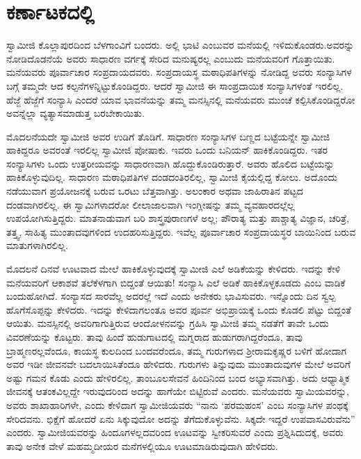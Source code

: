 
\chapter{ಕರ್ಣಾಟಕದಲ್ಲಿ}

 ಸ್ವಾಮೀಜಿ ಕೊಲ್ಲಾಪುರದಿಂದ ಬೆಳಗಾಂವಿಗೆ ಬಂದರು. ಅಲ್ಲಿ ಭಾಟಿ ಎಂಬುವರ ಮನೆಯಲ್ಲಿ ಇಳಿದುಕೊಂಡರು.ಅವರನ್ನು ನೋಡಿದೊಡನೆಯೆ ಅವರು ಸಾಧಾರಣ ವರ್ಗಕ್ಕೆ ಸೇರಿದ ಮನುಷ್ಯರಲ್ಲ ಎಂಬುದು ಮನೆಯವರಿಗೆ ಗೊತ್ತಾಯಿತು. ಮನೆಯವರು ಪೂರ್ವಾಚಾರ ಸಂಪ್ರದಾಯದವರು. ಸಂಪ್ರದಾಯಸ್ಥ ಮಠಾಧಿಪತಿಗಳನ್ನು ನೋಡಿದ್ದ ಅವರು ಸಂನ್ಯಾಸಿಗಳ ಬಗ್ಗೆ ತಮ್ಮದೇ ಆದ ಕಲ್ಪನೆಗಳನ್ನಿಟ್ಟುಕೊಂಡಿದ್ದರು. ಆದರೆ ಸ್ವಾಮೀಜಿ ಈ ಸಾಂಪ್ರದಾಯಿಕ ಸಂನ್ಯಾಸಿಗಳಂತೆ ಇರಲಿಲ್ಲ. ಹೆಜ್ಜೆ ಹೆಜ್ಜೆಗೆ ಸಂನ್ಯಾಸಿ ಎಂದರೆ ಯಾವ ಭಾವನೆಯನ್ನು ತಮ್ಮ ಮನಸ್ಸಿನಲ್ಲಿ ಮನೆಯವರು ಮುಂಚೆ ಕಲ್ಪಿಸಿಕೊಂಡಿದ್ದರೋ ಅವನ್ನೆಲ್ಲಾ ವ್ಯತ್ಯಾಸಮಾಡುತ್ತ ಬರಬೇಕಾಯಿತು. 

\vskip 2pt

 ಮೊದಲನೆಯದೇ ಸ್ವಾಮೀಜಿ ಅವರ ಉಡಿಗೆ ತೊಡಿಗೆ. ಸಾಧಾರಣ ಸಂನ್ಯಾಸಿಗಳ ಬಣ್ಣದ ಬಟ್ಟೆಯನ್ನೇ ಸ್ವಾಮೀಜಿ ಹಾಕಿದ್ದರೂ ಅವರಂತೆ ಇರಲಿಲ್ಲ ಸ್ವಾಮೀಜಿ ಪೋಷಾಕು. ಇವರು ಒಂದು ಬನಿಯನ್ ಹಾಕಿಕೊಂಡಿದ್ದರು. ಇತರ ಸಂನ್ಯಾಸಿಗಳು ಒಂದು ಉತ್ತರೀಯವನ್ನು ಸಾಧಾರಣವಾಗಿ ಹೊದ್ದುಕೊಂಡಿರುತ್ತಾರೆ. ಅವರು ಹೊಲಿದ ಬಟ್ಟೆಯನ್ನು ಹಾಕಿಕೊಳ್ಳುವುದಿಲ್ಲ. ಸಾಧಾರಣ ಮಠಾಧಿಪತಿಗಳ ದಂಡದಂತಿರಲಿಲ್ಲ, ಸ್ವಾಮೀಜಿ ಕೈಯಲ್ಲಿದ್ದ ಕೋಲು. ಅದೊಂದು ನಡೆಯುವಾಗ ಪ್ರಯೋಜನಕ್ಕೆ ಬರುವ ಒರಟು ಬೆತ್ತವಾಗಿತ್ತು. ಅಲಂಕಾರ ಅಥವಾ ಜಾಹಿರಾತಿನ ಪಟ್ಟದ ದಂಡವಾಗಿರಲಿಲ್ಲ. ಈ ಸ್ವಾಮಿಗಳಾದರೋ ಲೀಲಾಜಾಲವಾಗಿ ಇಂಗ್ಲೀಷನ್ನು ತಮ್ಮ ವ್ಯವಹಾರದಲ್ಲೆಲ್ಲ ಉಪಯೋಗಿಸುತ್ತಿದ್ದರು. ಮಾತನಾಡುವಾಗ ಬರಿ ಶಾಸ್ತ್ರಪುರಾಣಗಳೆ ಅಲ್ಲ; ಪೌರಾತ್ಯ ಮತ್ತು ಪಾಶ್ಚಾತ್ಯ ವಿಜ್ಞಾನ, ಚರಿತ್ರೆ, ತತ್ತ್ವ, ಸಾಹಿತ್ಯ ಮುಂತಾದವುಗಳಿಂದ ಉದಹರಿಸುತ್ತಿದ್ದರು. ಇವೆಲ್ಲ ಪೂರ್ವಾಚಾರ ಸಂಪ್ರದಾಯಸ್ಥರ ಬಾಯಿನಿಂದ ಬರುವ ಮಾತುಗಳಾಗಿರಲಿಲ್ಲ. 

\vskip 2pt

 ಮೊದಲನೆ ದಿನವೆ ಊಟವಾದ ಮೇಲೆ ಹಾಕಿಕೊಳ್ಳುವುದಕ್ಕೆ ಸ್ವಾಮೀಜಿ ಎಲೆ ಅಡಿಕೆಯನ್ನು ಕೇಳಿದರು. ಇದನ್ನು ಕೇಳಿ ಮನೆಯವರಿಗೆ ಆಕಾಶವೆ ತಲೆಕೆಳಗಾಗಿ ಬಿದ್ದಂತೆ ಆಯಿತು! ಸಂನ್ಯಾಸಿ ಎಲೆ ಅಡಿಕೆ ಹಾಕಿಕೊಳ್ಳಕೂಡದು ಎಂಬ ವಾಡಿಕೆ ಬಂದುಹೋಗಿದೆ. ಸಂನ್ಯಾಸದ ಸಾರವೆಲ್ಲ ಅದರಲ್ಲೆ ಇದೆ ಎಂದು ಅನೇಕರು ಭಾವಿಸುವರು. ಇನ್ನೊಂದು ದಿನ ಸ್ವಲ್ಪ ಹೊಗೆಸೊಪ್ಪನ್ನು ಕೇಳಿದರು. ಇದನ್ನು ಕೇಳಿದಾಗಲಂತೂ ಅವರ ಪೂರ್ವ ಅಭಿಪ್ರಾಯಕ್ಕೆ ಒಂದು ಕೊಡಲಿ ಪೆಟ್ಟು ಬಿದ್ದಂತೆ ಆಯಿತು. ಮನಸ್ಸಿನಲ್ಲಿ ಅವರಿಗಾಗುತ್ತಿರುವ ಆಂದೋಳನವನ್ನು ಗ್ರಹಿಸಿ ಸ್ವಾಮೀಜಿ ತಮ್ಮ ನಡತೆಗೆ ತಾವೇ ಒಂದು ವಿವರಣೆಯನ್ನು ಕೊಟ್ಟರು. ತಾವು ಹಿಂದೆ ಹುಡುಗಾಟದಲ್ಲಿ ಮಗ್ನರಾದ ಹುಡುಗರಾಗಿದ್ದರೆಂದೂ, ತಾವು ಬ್ರಾಹ್ಮಣರಲ್ಲವೆಂದೂ, ಕಾಯಸ್ಥ ಕುಲದಿಂದ ಬಂದವರೆಂದೂ, ತಮ್ಮ ಗುರುಗಳಾದ ಶ‍್ರೀರಾಮಕೃಷ್ಣರ ಬಳಿಗೆ ಹೋದಾಗ ಅವರ ಇಡೀ ಜೀವನವೇ ಬದಲಾಯಿಸಿತೆಂದೂ ಹೇಳಿದರು. ಗುರುಗಳು ತಿನ್ನುವುದು ಮುಂತಾದುವುಗಳ ಮೇಲೆ ಅವರಿಗೆ ಅಷ್ಟು ಗಮನ ಕೊಡು ಎಂದು ಹೇಳಿರಲಿಲ್ಲ. ತಾಂಬೂಲಸೇವನೆ ಹಿಂದಿನಿಂದ ಬಂದ ಅಭ್ಯಾಸವಾಗಿತ್ತು. ಅದು ಆಧ್ಯಾತ್ಮಿಕ ಜೀವನಕ್ಕೆ ಆತಂಕವಿಲ್ಲದ್ದೇ ಇರುವುದರಿಂದ ಅದನ್ನು ಹಾಗೆಯೇ ಬಿಟ್ಟಿರುವೆ ಎಂದರು. ಮನೆಯವರು ಸ್ವಾಮಿಯವರನ್ನು, ಅವರು ಶಾಖಾಹಾರಿಗಳೇ, ಎಂದು ಕೇಳಿದಾಗ ಸ್ವಾಮೀಜಿಯವರು “ನಾನು ‘ಪರಮಹಂಸ’ ಎಂಬ ಸಂನ್ಯಾಸಿಗಳ ಪಂಥಕ್ಕೆ ಸೇರಿದವನು. ಭಿಕ್ಷೆಗೆ ಹೋದರೆ ಏನು ಸಿಕ್ಕುವುದೋ ಅದನ್ನು ತೆಗೆದುಕೊಳ್ಳುವೆನು. ಸಿಕ್ಕದೇ ಇದ್ದರೆ ಉಪವಾಸವಿರುವೆನು” ಎಂದರು. ಸ್ವಾಮೀಜಿಯವರನ್ನು ಹಿಂದೂಗಳಲ್ಲದವರಿಂದ ಊಟವನ್ನು ಸ್ವೀಕರಿಸುವರೆ ಎಂದು ಪ್ರಶ್ನಿಸಿದುದಕ್ಕೆ, ಅವರು ತಾವು ಅನೇಕ ವೇಳೆ ಮಹಮ್ಮದೀಯರ ಮನೆಗಳಲ್ಲಿಯೂ ಊಟಮಾಡಿರುವುದಾಗಿ ಹೇಳಿದರು. 

